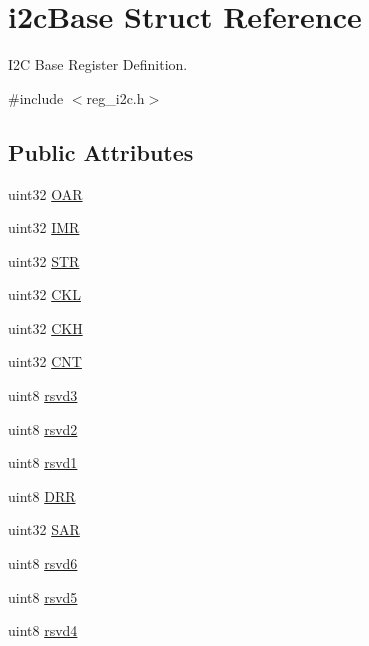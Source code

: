 \hypertarget{structi2cBase}{}\section{i2c\+Base Struct Reference}
\label{structi2cBase}


I2C Base Register Definition.  




{\ttfamily \#include $<$reg\+\_\+i2c.\+h$>$}

\subsection*{Public Attributes}
\begin{DoxyCompactItemize}
\item 
uint32 \mbox{\hyperlink{structi2cBase_a96c4486bd2527a84eed4bd18803b5826}{O\+AR}}
\item 
uint32 \mbox{\hyperlink{structi2cBase_a74d027eb9dbb6d578a04eeddb21db12a}{I\+MR}}
\item 
uint32 \mbox{\hyperlink{structi2cBase_ad7d4f7dca32da0bdf0fca5f5cf6c2c58}{S\+TR}}
\item 
uint32 \mbox{\hyperlink{structi2cBase_a7693e99a51d0a6b9b2154c0ac845bf7c}{C\+KL}}
\item 
uint32 \mbox{\hyperlink{structi2cBase_a56bf7d44f7c3b0cd5c41056c8e4d6864}{C\+KH}}
\item 
uint32 \mbox{\hyperlink{structi2cBase_a4f00b9b1013384dd6814e9447e8cbfe7}{C\+NT}}
\item 
uint8 \mbox{\hyperlink{structi2cBase_aa97348ad0460434f507237f326f9a6ab}{rsvd3}}
\item 
uint8 \mbox{\hyperlink{structi2cBase_a51fb82d359c0f1a92a2a32faa033230c}{rsvd2}}
\item 
uint8 \mbox{\hyperlink{structi2cBase_a7b2c3dca960f7ee7abc150a7be298bcd}{rsvd1}}
\item 
uint8 \mbox{\hyperlink{structi2cBase_aeb453c379b5d1f00d08474410894908a}{D\+RR}}
\item 
uint32 \mbox{\hyperlink{structi2cBase_a1e6c7b3fec813674897b126a5023a8ac}{S\+AR}}
\item 
uint8 \mbox{\hyperlink{structi2cBase_a6d7693e55195ed7c6326c674487611d8}{rsvd6}}
\item 
uint8 \mbox{\hyperlink{structi2cBase_a2a59cdb9e119ba17be8553574dd2133c}{rsvd5}}
\item 
uint8 \mbox{\hyperlink{structi2cBase_aa20d2b4a449c40f421a4304ce755c38a}{rsvd4}}
\item 

\end{DoxyCompactItemize}
